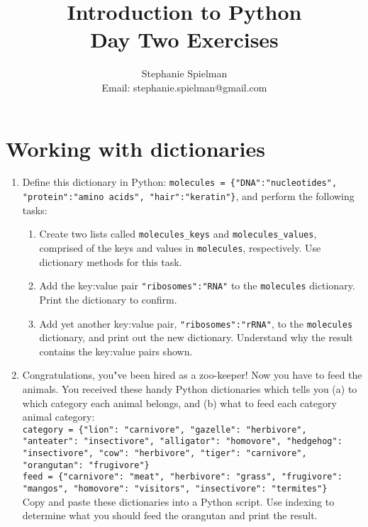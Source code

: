 \documentclass{article}[12pt]
\newcommand{\code}[1]{\texttt{#1}}  %
\begin{document}
\title{Introduction to Python \\ Day Two Exercises}
\author{Stephanie Spielman \\ \footnotesize{Email: stephanie.spielman@gmail.com}}
\date{}
\maketitle{}

\section{Working with dictionaries}

\begin{enumerate}[itemsep=5ex]
	
	\item Define this dictionary in Python: \code{molecules = \{"DNA":"nucleotides", "protein":"amino acids", "hair":"keratin"\}}, and perform the following tasks:
	\begin{enumerate}[itemsep=2ex]
		\item Create two lists called \code{molecules\_keys} and \code{molecules\_values}, comprised of the keys and values in \code{molecules}, respectively. Use dictionary methods for this task.
		\item Add the key:value pair \code{"ribosomes":"RNA"} to the \code{molecules} dictionary. Print the dictionary to confirm.
		\item Add yet another key:value pair, \code{"ribosomes":"rRNA"}, to the \code{molecules} dictionary, and print out the new dictionary. Understand why the result contains the key:value pairs shown.
	\end{enumerate}
	
	
	\item Congratulations, you"ve been hired as a zoo-keeper! Now you have to feed the animals. You received these handy Python dictionaries which tells you (a) to which category each animal belongs, and (b) what to feed each category animal category: \\
	
	\code{category = \{"lion": "carnivore", "gazelle": "herbivore", "anteater": "insectivore", "alligator": "homovore", "hedgehog": "insectivore", "cow": "herbivore", "tiger": "carnivore", "orangutan": "frugivore"\}} \\
	
	\code{feed = \{"carnivore": "meat", "herbivore": "grass", "frugivore": "mangos", "homovore": "visitors", "insectivore": "termites"\} } \\
	
	\noindent Copy and paste these dictionaries into a Python script. Use indexing to determine what you should feed the orangutan and print the result.
	

\end{enumerate}
\end{document}
